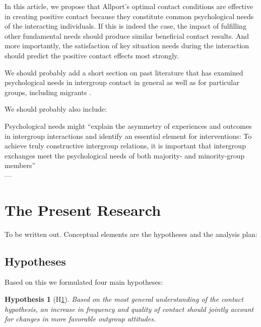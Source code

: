 \documentclass[nobib]{tufte-handout}
\theoremstyle{break}
\theoremstyle{plain}
\newtheorem{hyp}{Hypothesis}
\begin{document}
In this article, we propose that Allport's optimal contact conditions are effective in creating positive contact because they constitute common psychological needs of the interacting individuals. If this is indeed the case, the impact of fulfilling other fundamental needs should produce similar beneficial contact results. And more importantly, the satisfaction of key situation needs during the interaction should predict the positive contact effects most strongly.

We should probably add a short section on past literature that has examined psychological needs in intergroup contact in general \citep[e.g.,][]{Shnabel2008} as well as for particular groups, including migrants \citep[e.g.,][]{Celebi2017}.

\noindent We should probably also include:
\begin{displayquote}
    Psychological needs might “explain the asymmetry of experiences and outcomes in intergroup interactions and identify an essential element for interventions: To achieve truly constructive intergroup relations, it is important that intergroup exchanges meet the psychological needs of both majority- and minority-group members” \\
    \hfill --- \citep[][p. 611]{Dovidio2017}
\end{displayquote}

\section{The Present Research}
To be written out. Conceptual elements are the hypotheses and the analysis plan:
\subsection{Hypotheses}

Based on this we formulated four main hypotheses:

\begin{hyp}[H\ref{hyp:contact}] \label{hyp:contact}
Based on the most general understanding of the contact hypothesis, an increase in frequency and quality of contact should jointly account for changes in more favorable outgroup attitudes.
\end{hyp}
\end{document}
